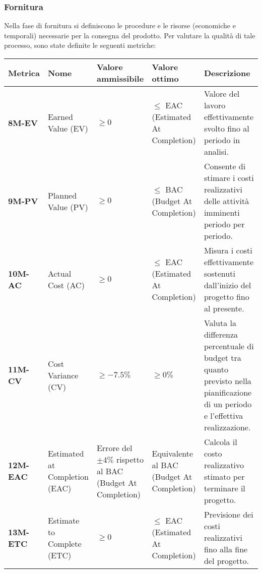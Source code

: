 \subsubsection{Fornitura}
Nella fase di fornitura si definiscono le procedure e le risorse (economiche e temporali) necessarie per la consegna del prodotto.
Per valutare la qualità di tale processo, sono state definite le seguenti metriche:
\begin{longtable}{|>{\raggedright\arraybackslash}m{}|>{\raggedright\arraybackslash}m{}|>{\raggedright\arraybackslash}m{}|>{\raggedright\arraybackslash}m{}|>{\raggedright\arraybackslash}m{}|}
	\hline
	\textbf{Metrica}  & \textbf{Nome}                & \textbf{Valore ammissibile} & \textbf{Valore ottimo} & \textbf{Descrizione}\\
	\hline
	\endhead
	\textbf{8M-EV}   & Earned Value (EV)             & $\geq 0$                                                    & $\leq$ EAC (Estimated At Completion)      & Valore del lavoro effettivamente svolto fino al periodo in analisi.                                                            \\
	\hline
	\textbf{9M-PV}   & Planned Value (PV)            & $\geq 0$                                                    & $\leq$ BAC (Budget At Completion)         & Consente di stimare i costi realizzativi delle attività imminenti periodo per periodo.                                         \\
	\hline
	\textbf{10M-AC}  & Actual Cost (AC)              & $\geq 0$                                                    & $\leq$ EAC (Estimated At Completion)      & Misura i costi effettivamente sostenuti dall'inizio del progetto fino al presente.                                             \\
	\hline
	\textbf{11M-CV}  & Cost Variance (CV)            & $\geq -7.5\%$                                               & $\geq 0\%$                                & Valuta la differenza percentuale di budget tra quanto previsto nella pianificazione di un periodo e l'effettiva realizzazione. \\
	\hline
	\textbf{12M-EAC} & Estimated at Completion (EAC) & Errore del $\pm 4\%$ rispetto al BAC (Budget At Completion) & Equivalente al BAC (Budget At Completion) & Calcola il costo realizzativo stimato per terminare il progetto.                                                               \\
	\hline
	\textbf{13M-ETC} & Estimate to Complete (ETC)    & $\geq 0$                                                    & $\leq$ EAC (Estimated At Completion)      & Previsione dei costi realizzativi fino alla fine del progetto.                                                                 \\

\end{longtable}
